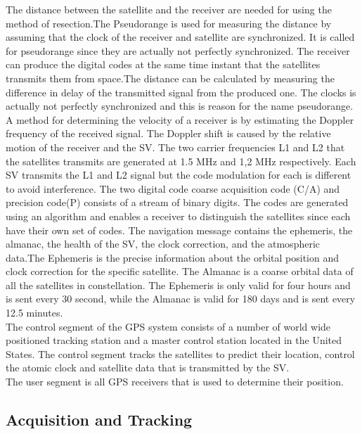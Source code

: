  The distance between the satellite and the receiver are needed for using the method of resection.The Pseudorange is used for measuring the distance by assuming that the clock of the receiver and satellite are synchronized. It is called for pseudorange since they are actually not perfectly synchronized. The receiver can produce the digital codes at the same time instant that the satellites transmits them from space.The distance can be calculated by measuring the difference in delay of the transmitted signal from the produced one. The clocks is actually not perfectly synchronized and this is reason for the name pseudorange. \\
 A method for determining the velocity of a receiver is by estimating the Doppler frequency of the received signal. The Doppler shift is caused by the relative motion of the receiver and the SV. The two carrier frequencies L1 and L2 that the satellites transmits are generated at 1.5 MHz and 1,2 MHz respectively.  Each SV transmits the L1 and L2 signal but the code modulation for each is different to avoid interference. The two digital code coarse acquisition code (C/A) and precision code(P) consists of a stream of binary digits. The codes are generated using an algorithm and enables a receiver to distinguish the satellites since each have their own set of codes. The navigation message contains the ephemeris, the almanac, the health of the SV, the clock correction, and the atmospheric data.The Ephemeris is the precise information about the orbital position and clock correction for the specific satellite. The Almanac is a coarse orbital data of all the satellites in constellation. The Ephemeris is only valid for four hours and is sent every 30  second, while the Almanac is valid for 180 days and is sent every 12.5 minutes. \\
 The control segment of the GPS system consists of a number of world wide positioned tracking station and a master control station located in the United States. The control segment tracks the satellites to predict their location, control the atomic clock and satellite data that is transmitted by the SV. \\ The user segment is all GPS receivers that is used to determine their position.
  
  
  \subsection{Acquisition and Tracking}
  
